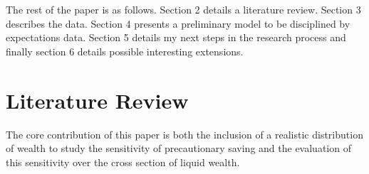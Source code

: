 \documentclass[titlepage]{\econtex}\providecommand{\texname}{Dissertation-Proposal}
\begin{document}


The rest of the paper is as follows. Section 2 details a literature review. Section 3 describes the data. Section 4 presents a preliminary model to be disciplined by expectations data. Section 5 details my next steps in the research process and finally section 6 details possible interesting extensions. 

\hypertarget{Literature Review}{}
\section{Literature Review}

The core contribution of this paper is both the inclusion of a realistic distribution of wealth to study the sensitivity of precautionary saving and the evaluation of this sensitivity over the cross section of liquid wealth. \\
\end{document}
